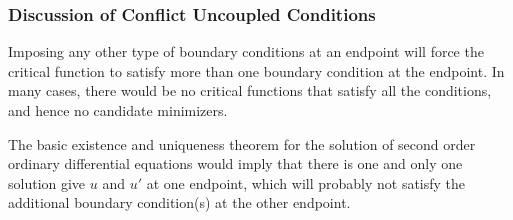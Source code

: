 \documentclass{article}
\begin{document}
\subsubsection{Discussion of Conflict Uncoupled Conditions}\label{sec:dfadf}
Imposing any other type of boundary conditions at an endpoint  will force the critical function to satisfy more than one boundary condition at the endpoint. In many cases, there would be no critical functions that satisfy all the conditions, and hence no candidate minimizers.
\begin{rema}
The basic existence and uniqueness theorem for the solution of second order ordinary differential equations would imply that there is one and only one solution give $u$ and $u'$ at one endpoint, which will probably not satisfy the additional boundary condition(s) at the other endpoint.
\end{rema}
\end{document}
